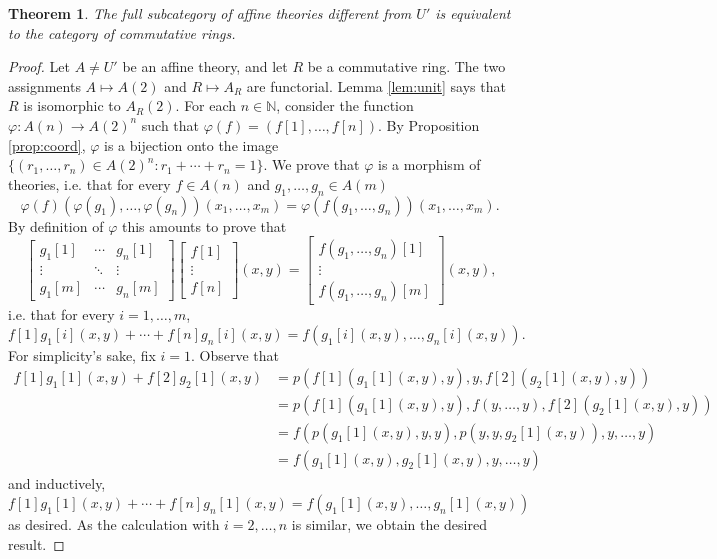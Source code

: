 \documentclass{amsart}
\numberwithin{equation}{section}
\theoremstyle{plain}
\newtheorem{theorem}{Theorem}[section]
\theoremstyle{definition}
\begin{document}
\begin{theorem}
  \label{thm:equiring}
  The full subcategory of affine theories different from $U'$ is equivalent to the category of commutative rings. 
\end{theorem}
\begin{proof}
  Let $A\neq U'$ be an affine theory, and let $R$ be  a commutative ring. 
  The two assignments $A \mapsto A(2)$ and $R \mapsto A_R$ are functorial. 
  Lemma \ref{lem:unit} says that $R$ is isomorphic to $A_R(2)$. 
  For each $n \in \mathbb{N}$, consider the function $\varphi: A(n) \to A(2)^n$ such that $\varphi(f) = (f[1], \ldots, f[n])$. 
  By Proposition \ref{prop:coord}, $\varphi$ is a bijection onto the image $\{(r_1, \ldots, r_n) \in A(2)^n : r_1 + \cdots + r_n =1\}$. 
  We prove that $\varphi$ is a morphism of theories, i.e. that for every $f \in A(n)$ and $g_1, \ldots, g_n \in A(m)$
  \begin{equation*}
    \varphi(f)(\varphi(g_1), \ldots, \varphi(g_n))(x_1, \ldots, x_m) = \varphi(f(g_1, \ldots,g_n))(x_1, \ldots, x_m) \text{.} 
  \end{equation*}
  By definition of $\varphi$ this amounts to prove that 
  \begin{equation*}
    \begin{bmatrix}
      g_1[1] & \cdots & g_n[1] \\
      \vdots & \ddots & \vdots \\
      g_1[m] & \cdots & g_n[m] 
    \end{bmatrix}
    \begin{bmatrix}
      f[1] \\
      \vdots \\
      f[n]
    \end{bmatrix}
    (x,y) = 
    \begin{bmatrix}
    f(g_1, \ldots, g_n)[1] \\
    \vdots \\
    f(g_1, \ldots, g_n)[m]
    \end{bmatrix}
    (x,y) \text{,}
  \end{equation*}
  i.e. that for every $i=1, \ldots, m$, 
  \begin{equation*}
    f[1]g_1[i] (x,y) + \cdots +f[n]g_n[i](x,y)=f(g_1[i](x,y), \ldots, g_n[i](x,y)) \text{.}
  \end{equation*} 
  For simplicity's sake, fix $i=1$. 
  Observe that 
  \begin{align*}
    f[1]g_1[1] (x,y) + f[2]g_2[1](x,y) & = p(f[1](g_1[1](x,y),y),y, f[2](g_2[1](x,y),y)) \\
    & = p(f[1](g_1[1](x,y),y),f(y,\ldots,y), f[2](g_2[1](x,y),y))  \\
    & = f(p(g_1[1](x,y),y,y),p(y,y,g_2[1](x,y)), y, \ldots, y) \\
    & = f(g_1[1](x,y), g_2[1](x,y), y, \ldots, y)
  \end{align*}
  and inductively, $f[1]g_1[1] (x,y) + \cdots +f[n]g_n[1](x,y)=f(g_1[1](x,y), \ldots, g_n[1](x,y))$ as desired.
  As the calculation with $i=2, \ldots, n$ is similar, we obtain the desired result. 
\end{proof}
\end{document}
